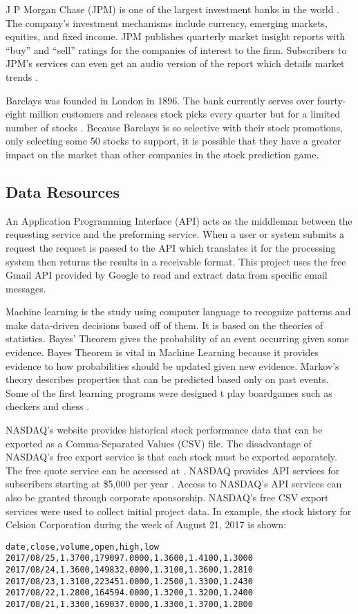 \documentclass[sigconf]{acmart}
\begin{document}
J P Morgan Chase (JPM) is one of the largest investment banks in the world \cite{www-investBanks}. The company's investment mechanisms include currency, emerging markets, equities, and fixed income. JPM publishes quarterly market insight reports with ``buy'' and ``sell'' ratings for the companies of interest to the firm. Subscribers to JPM's services can even get an audio version of the report which details market trends \cite{www-JPM}.

Barclays was founded in London in 1896. The bank currently serves over fourty-eight million customers and releases stock picks every quarter but for a limited number of stocks \cite{www-investBanks}. Because Barclays is so selective with their stock promotions, only selecting some 50 stocks to support, it is possible that they have a greater impact on the market than other companies in the stock prediction game. 

\subsection{Data Resources}
An Application Programming Interface (API) acts as the middleman between the requesting service and the preforming service. When a user or system submits a request the request is passed to the API which translates it for the processing system then returns the results in a receivable format. This project uses the free Gmail API provided by Google to read and extract data from specific email messages.

Machine learning is the study using computer language to recognize patterns and make data-driven decisions based off of them. It is based on the theories of statistics. Bayes' Theorem gives the probability of an event occurring given some evidence. Bayes Theorem is vital in Machine Learning because it provides evidence to how probabilities should be updated given new evidence. Markov's theory describes properties that can be predicted based only on past events. Some of the first learning programs were designed t play boardgames such as checkers and chess \cite{www-wikiMachine}.

NASDAQ's website provides historical stock performance data that can be exported as a Comma-Separated Values (CSV) file. The disadvantage of NASDAQ's free export service is that each stock must be exported separately. The free quote service can be accessed at \cite{www-quotenasdaq}. NASDAQ provides API services for subscribers starting at \$5,000 per year \cite{www-nasdaq-sub}. Access to NASDAQ's API services can also be granted through corporate sponsorship. NASDAQ's free CSV export services were used to collect initial project data. In example, the stock history for Celsion Corporation during the week of August 21, 2017 is shown:
\begin{lstlisting}
date,close,volume,open,high,low
2017/08/25,1.3700,179097.0000,1.3600,1.4100,1.3000
2017/08/24,1.3600,149832.0000,1.3100,1.3600,1.2810
2017/08/23,1.3100,223451.0000,1.2500,1.3300,1.2430
2017/08/22,1.2800,164594.0000,1.3200,1.3200,1.2400
2017/08/21,1.3300,169037.0000,1.3300,1.3700,1.2800
\end{lstlisting}
\end{document}

